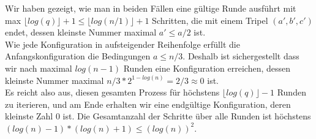 Wir haben gezeigt, wie man in beiden Fällen eine gültige Runde ausführt mit max $\lfloor log(q)\rfloor +1\leq \lfloor log(n/1)\rfloor +1$ Schritten, die mit einem Tripel $(a', b', c')$ endet, dessen kleinste Nummer maximal $a'\leq a/2$ ist. \\
Wie jede Konfiguration in aufsteigender Reihenfolge erfüllt die Anfangskonfiguration die Bedingungen $a \leq n/3$. Deshalb ist sichergestellt dass wir nach maximal $log(n-1)$ Runden eine Konfiguration erreichen, dessen kleinste Nummer maximal $n/3 * 2^{1-log(n)}=2/3 \approx 0$ ist. \\
Es reicht also aus, diesen gesamten Prozess für höchstens $\lfloor log(q)\rfloor -1$ Runden zu iterieren, und am Ende erhalten wir eine endgültige Konfiguration, deren kleinste Zahl $0$ ist. Die Gesamtanzahl der Schritte über alle Runden ist höchstens $(log(n)-1)*(log(n)+1) \leq (log(n))^2$. 

\autocite{Frei.2020} %